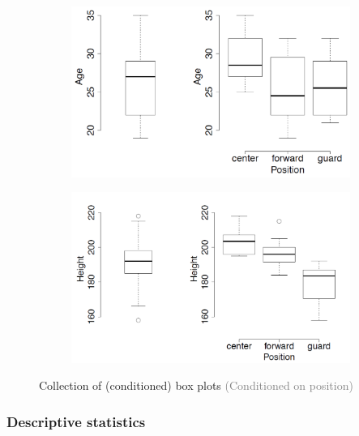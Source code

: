 \begin{figure}[H]
  \centering
  \begin{subfigure}{0.45\textwidth}
    \centering
    \includegraphics[width=\textwidth]{assets/visualization_and_extraction/feature_relation/box_weak.png}
  \end{subfigure}
  \hspace*{0.05\textwidth}
  \begin{subfigure}{0.45\textwidth}
    \centering
    \includegraphics[width=\textwidth]{assets/visualization_and_extraction/feature_relation/box_strong.png}
  \end{subfigure}
  \caption{Collection of (conditioned) box plots \textcolor{gray}{\footnotesize (Conditioned on position)}}
  \label{fig:2_box_plot_coll}
\end{figure}

\subsubsection*{Descriptive statistics}

